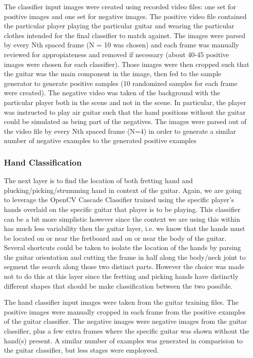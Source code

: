 \par
The classifier input images were created using recorded video files:
one set for positive images and one set for negative images.
The positive video file contained the particular player playing the particular guitar
and wearing the particular clothes intended for the final classifier to match against.
The images were parsed by every Nth spaced frame (N = 10 was chosen)
and each frame was manually reviewed for appropiateness and removed if necessary
(about 40-45 positive images were chosen for each classifier).
Those images were then cropped such that the guitar was the main component in the image,
then fed to the sample generator to generate positive samples
(10 randomized samples for each frame were created).
The negative video was taken of the background with the particular player both in the scene
and not in the scene.
In particular, the player was instructed to play air guitar such that the hand positions
without the guitar could be simulated as being part of the negatives.
The images were parsed out of the video file by every Nth spaced frame (N=4) in order to generate
a similar number of negative examples to the generated positive examples

\subsubsection{Hand Classification}
The next layer is to find the location of both fretting hand and plucking/picking/strumming hand in context of the guitar.
Again, we are going to leverage the OpenCV Cascade Classifier trained using the specific player's hands overlaid on the
specific guitar that player is to be playing.
This classifier can be a bit more simplistic however since the context we are using this 
within has much less variability then the guitar layer, 
i.e. we know that the hands must be located on or near the fretboard and on or near the body of the guitar.
Several shortcuts could be taken to isolate the location of the hands by parsing the guitar orientation
and cutting the frame in half along the body/neck joint to segment the search along those two distinct parts.
However the choice was made not to do this at this layer since the fretting and picking hands have distinctly
different shapes that should be make classification between the two possible.
\par
The hand classifier input images were taken from the guitar training files.
The positive images were manually cropped in each frame from the positive examples of the guitar classifier.
The negative images were negative images from the guitar classifier, plus a few extra frames where
the specific guitar was shown without the hand(s) present.
A similar number of examples was generated in comparision to the guitar classifier,
but less stages were employeed.

